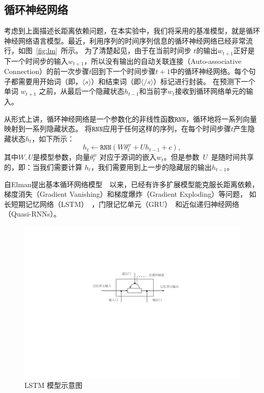 \subsection{循环神经网络}
考虑到上面描述长距离依赖问题，在本实验中，我们将采用的基准模型，就是循环神经网络语言模型。最近，利用序列的时间序列信息的循环神经网络已经非常流行，如图~\ref{fig:lm}~所示。 为了清楚起见，由于在当前时间步 $ t $的输出$ w_{t + 1} $正好是下一个时间步的输入$ w_ {t + 1} $，所以没有输出的自动关联连接（Auto-associative Connection）的前一次步骤$ t $回到下一个时间步骤$ t + 1 $中的循环神经网络。每个句子都需要用开始词（即，$ \langle s \rangle $）和结束词（即$ \langle / s \rangle $）标记进行封装。 在预测下一个单词 $ w_ {t + 1} $ 之前，从最后一个隐藏状态$ h_ {t-1} $和当前字$ w_t $接收到循环网络单元的输入。

从形式上讲，循环神经网络是一个参数化的非线性函数$ \mathtt{RNN} $，循环地将一系列向量映射到一系列隐藏状态。 将$ \mathtt{RNN} $应用于任何这样的序列，在每个时间步骤$ t $产生隐藏状态$ h_t $，如下所示：
\begin{equation}
  h_t \leftarrow  \mathtt{RNN}(W\theta^w_t + U h_{t-1} +c),
\end{equation}
其中$ W,U $是模型参数，向量$ \theta^w_t$ 对应于源词的嵌入$ w_t $。但是参数~$U$~是随时间共享的，即：当我们需要计算 $h_t$，我们需要用到上一步的隐藏层的输出$h_{t-1}$。

自Elman提出基本循环网络模型~~以来，已经有许多扩展模型能克服长距离依赖，梯度消失（Gradient Vanishing）和梯度爆炸（Gradient Exploding）等问题， 如长短期记忆网络（LSTM）~，门限记忆单元（GRU）~和近似递归神经网络（Quasi-RNNs）。

\begin{figure}[!t]
  \centering
  \includegraphics[width=.79\linewidth]{./figures/lstm.pdf}
  \caption{LSTM 模型示意图}\label{fig:lstm}
\end{figure}

